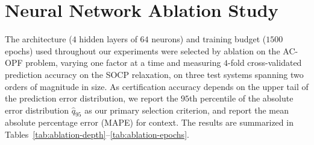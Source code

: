 \documentclass[10pt]{article} %
\theoremstyle{plain}
\theoremstyle{definition}
\theoremstyle{remark}
\begin{document}






\appendix

\section{Neural Network Ablation Study} \label{app:ablation}

The architecture ($4$ hidden layers of $64$ neurons) and training budget ($1500$ epochs) used throughout our experiments were selected by ablation on the AC-OPF problem, varying one factor at a time and measuring $4$-fold cross-validated prediction accuracy on the SOCP relaxation, on three test systems spanning two orders of magnitude in size. As certification accuracy depends on the upper tail of the prediction error distribution, we report the $95$th percentile of the absolute error distribution $\hat q_{95}$ as our primary selection criterion, and report the mean absolute percentage error (MAPE) for context. The results are summarized in Tables~\ref{tab:ablation-depth}--\ref{tab:ablation-epochs}.
\end{document}
